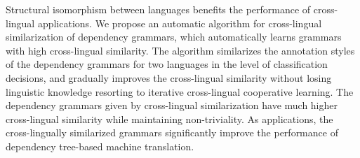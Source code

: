 Structural isomorphism between languages benefits the performance of cross-lingual applications. We propose an automatic algorithm for cross-lingual similarization of dependency grammars, which automatically learns grammars with high cross-lingual similarity. The algorithm similarizes the annotation styles of the dependency grammars for two languages in the level of classification decisions, and gradually improves the cross-lingual similarity without losing linguistic knowledge resorting to iterative cross-lingual cooperative learning. The dependency grammars given by cross-lingual similarization have much higher cross-lingual similarity while maintaining non-triviality. As applications, the cross-lingually similarized grammars significantly improve the performance of dependency tree-based machine translation.
